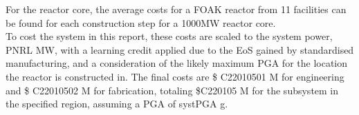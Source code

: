 For the reactor core, the average costs for a FOAK reactor from 11 facilities can be found for each construction step for a 1000MW reactor core.\\

To cost the system in this report, these costs are scaled to the system power, PNRL MW, with a learning credit applied due to the EoS gained by standardised manufacturing, and a consideration of the likely maximum PGA for the location the reactor is constructed in. The final costs are \$ C22010501 M for engineering and \$ C22010502 M for fabrication, totaling \$C220105 M for the subsystem in the specified region, assuming a PGA of systPGA g.
